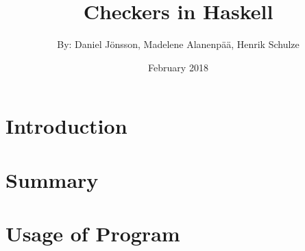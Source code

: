 \documentclass[12pt,a4paper]{article}
\title{Checkers in Haskell}
\author{By: Daniel Jönsson, Madelene Alanenpää, Henrik Schulze }
\date{February 2018}
\begin{document}
\maketitle
\newpage
\tableofcontents
\newpage
\section{Introduction}
\section{Summary}
\section{Usage of Program}
\end{document}
